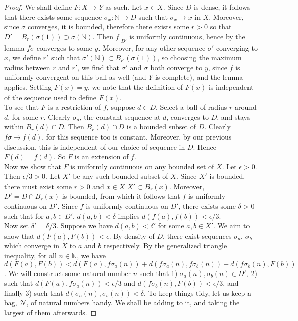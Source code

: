 \documentclass[11pt]{article}
\newcommand{\N}{\mathbb{N}}
\theoremstyle{definition}
\begin{document}
\begin{proof}



We shall define $F: X\to Y$ as such. Let $x\in X$. Since $D$ is dense, it follows that there exists some sequence $\sigma_x : \N\to D$ such that $\sigma_x \to x$ in $X$. Moreover, since $\sigma$ converges, it is bounded, therefore there exists some $ r > 0 $ so that $D' = B_r(\sigma(1) )\supset \sigma(\N)$. Then $f|_{D'}$ is uniformly continuous, hence by the lemma $f\sigma$ converges to some $y$. Moreover, for any other sequence $\sigma'$ converging to $x$, we define $r'$ such that $ \sigma'(\N) \subset B_{r'}(\sigma(1)) $, so choosing the maximum radius between $r$ and $r'$, we find that $\sigma'$ and $\sigma$ both converge to $y$, since $f$ is uniformly convergent on this ball as well (and $Y$ is complete), and the lemma applies. Setting $F(x) = y$, we note that the definition of $F(x)$ is independent of the sequence used to define $F(x)$.\\

To see that $F$ is a restriction of $f$, suppose $d\in D$. Select a ball of radius $r$ around $d$, for some $r$. Clearly $\sigma_d$, the constant sequence at $d$, converges to $D$, and stays within $B_r(d)\cap D$. Then $B_r(d)\cap D$ is a bounded subset of $D$. Clearly $f\sigma\to f(d)$, for this sequence too is constant. Moreover, by our previous discussion, this is independent of our choice of sequence in $D$. Hence $F(d) = f(d)$. So $F$ is an extension of $f$. \\

Now we show that $F$ is uniformly continuous on any bounded set of $X$. Let $\epsilon > 0$. Then $\epsilon/3 > 0$. Let $X'$ be any such bounded subset of $X$. Since $X'$ is bounded, there must exist some $r>0$ and $x\in X$ $ X'\subset B_r(x) $. Moreover, $D' = D\cap B_r(x)$ is bounded, from which it follows that $f$ is uniformly continuous on $D'$. Since $f$ is uniformly continuous on $D'$, there exists some $\delta > 0$ such that for $a,b\in D'$, $d(a,b) < \delta$ implies $d(f(a), f(b)) < \epsilon /3$.\\
 
Now set $\delta' = \delta/3$. Suppose we have $ d(a,b) < \delta' $ for some $ a,b\in X' $. We aim to show that $d(F(a), F(b) ) < \epsilon$. By density of $D$, there exist sequences $\sigma_a$, $\sigma_b$ which converge in $X$ to $a$ and $b$ respectively. By the generalized triangle inequality, for all $n\in \N$, we have $ d(F(a), F(b) ) < d(F(a) , f\sigma_a(n)) + d(f\sigma_a(n) , f\sigma_b(n) ) + d(f\sigma_b(n) , F(b))$. We will construct some natural number $n$ such that 1) $\sigma_a(n), \sigma_b(n) \in D'$, 2) such that $d(F(a), f\sigma_a(n)) < \epsilon /3$ and $d(f\sigma_b(n) , F(b)) < \epsilon /3$, and finally 3) such that $ d(\sigma_a(n) ,\sigma_b(n)  ) < \delta$. To keep things tidy, let us keep a bag, $\mathcal{N}$, of natural numbers handy. We shall be adding to it, and taking the largest of them afterwards.


\end{proof}
\end{document}
